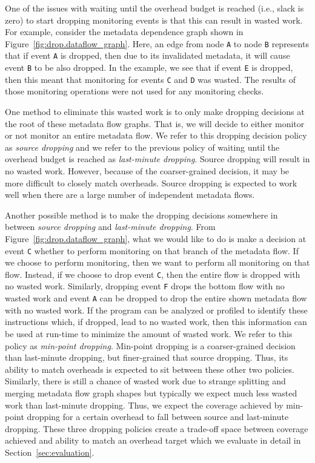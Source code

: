 One of the issues with waiting until the overhead budget is reached (i.e.,
slack is zero) to start dropping monitoring events is that this can result in
wasted work. For example, consider the metadata dependence graph shown in
Figure~\ref{fig:drop.dataflow_graph}. Here, an edge from node {\tt A} to node
{\tt B} represents that if event {\tt A} is dropped, then due to its
invalidated metadata, it will cause event {\tt B} to be also dropped. In the
example, we see that if event {\tt E} is dropped, then this meant that
monitoring for events {\tt C} and {\tt D} was wasted. The results of those
monitoring operations were not used for any monitoring checks.

One method to eliminate this wasted work is to only make dropping decisions at
the root of these metadata flow graphs. That is, we will decide to either monitor or
not monitor an entire metadata flow. We refer to this dropping decision policy
as \emph{source dropping} and we refer to the previous policy of waiting until
the overhead budget is reached as \emph{last-minute dropping}. Source dropping will
result in no wasted work. However, because of the coarser-grained decision, it
may be more difficult to closely match overheads. Source dropping is expected
to work well when there are a large number of independent metadata flows.

Another possible method is to make the dropping decisions somewhere in between
\emph{source dropping} and \emph{last-minute dropping}. From
Figure~\ref{fig:drop.dataflow_graph}, what we would like to do is make a
decision at event {\tt C} whether to perform monitoring on that branch of the
metadata flow. If we choose to perform monitoring, then we want to perform all
monitoring on that flow. Instead, if we choose to drop event {\tt C}, then the
entire flow is dropped with no wasted work. Similarly, dropping event {\tt F}
drops the bottom flow with no wasted work and event {\tt A} can be dropped to
drop the entire shown metadata flow with no wasted work. If the program can be
analyzed or profiled to identify these instructions which, if dropped, lead to
no wasted work, then this information can be used at run-time to minimize the
amount of wasted work. We refer to this policy as \emph{min-point dropping}.
Min-point dropping is a coarser-grained decision than last-minute dropping, but
finer-grained that source dropping. Thus, its ability to match overheads is
expected to sit between these other two policies. Similarly, there is still a
chance of wasted work due to strange splitting and merging metadata flow graph
shapes but typically we expect much less wasted work than last-minute
dropping. Thus, we expect the coverage achieved by min-point dropping for a
certain overhead to fall between source and last-minute dropping. These three
dropping policies create a trade-off space between coverage achieved and
ability to match an overhead target which we evaluate in detail in
Section~\ref{sec:evaluation}.

